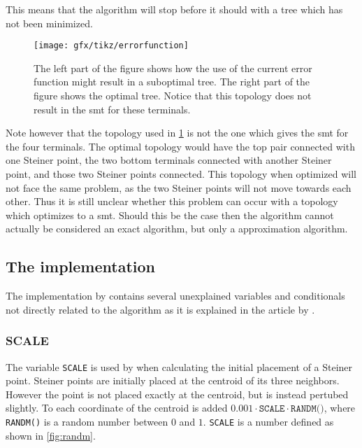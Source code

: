 This means that the algorithm will stop before it should with a tree which has
not been minimized.

\begin{figure}[htbp]
  \centering
  \texttt{[image: gfx/tikz/errorfunction]}
  \caption[Possible problem with the error function]{The left part of the figure
    shows how the use of the current error function might result in a suboptimal
    tree. The right part of the figure shows the optimal tree. Notice that
    this topology does not result in the \ac{smt} for these
    terminals.\label{fig:error-function}}
\end{figure}

Note however that the topology used in \cref{fig:error-function} is not the
one which gives the \ac{smt} for the four terminals. The optimal topology
would have the top pair connected with one Steiner point, the two bottom
terminals connected with another Steiner point, and those two Steiner points
connected. This topology when optimized will not face the same problem, as the
two Steiner points will not move towards each other. Thus it is still unclear
whether this problem can occur with a topology which optimizes to a \ac{smt}.
Should this be the case then the algorithm cannot actually be considered an
exact algorithm, but only a approximation algorithm.

\subsection{The implementation}
\label{sec:implementation}

The implementation by \citeauthor{smith1992} contains several unexplained variables and conditionals not
directly related to the algorithm as it is explained in the article by \textcite{smith1992}.

\subsubsection{SCALE}
\label{sec:scale}

The variable \texttt{SCALE} is used by \citeauthor{smith1992} when calculating the initial
placement of a Steiner point. Steiner points are initially placed at the
centroid of its three neighbors. However the point is not placed exactly at the
centroid, but is instead pertubed slightly. To each coordinate of the centroid
is added $0.001 \cdot \texttt{SCALE} \cdot \texttt{RANDM()}$, where \texttt{RANDM()} is a
random number between $0$ and $1$. \texttt{SCALE} is a number defined as shown
in \cref{fig:randm}.


